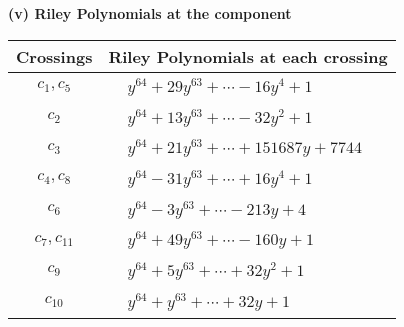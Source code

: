 \documentclass[1p]{elsarticle_modified}
\theoremstyle{definition}
\begin{document}
\newpage\renewcommand{\arraystretch}{1}
\flushleft \textbf{(v) Riley Polynomials at the component}\newline \\
\begin{tabular}{m{50pt}|m{274pt}}
Crossings & \hspace{64pt}Riley Polynomials at each crossing \\
\hline $$\begin{aligned}c_{1},c_{5}\end{aligned}$$&$\begin{aligned}
&y^{64}+29 y^{63}+\cdots-16 y^4+1
\end{aligned}$\\
\hline $$\begin{aligned}c_{2}\end{aligned}$$&$\begin{aligned}
&y^{64}+13 y^{63}+\cdots-32 y^2+1
\end{aligned}$\\
\hline $$\begin{aligned}c_{3}\end{aligned}$$&$\begin{aligned}
&y^{64}+21 y^{63}+\cdots+151687 y+7744
\end{aligned}$\\
\hline $$\begin{aligned}c_{4},c_{8}\end{aligned}$$&$\begin{aligned}
&y^{64}-31 y^{63}+\cdots+16 y^4+1
\end{aligned}$\\
\hline $$\begin{aligned}c_{6}\end{aligned}$$&$\begin{aligned}
&y^{64}-3 y^{63}+\cdots-213 y+4
\end{aligned}$\\
\hline $$\begin{aligned}c_{7},c_{11}\end{aligned}$$&$\begin{aligned}
&y^{64}+49 y^{63}+\cdots-160 y+1
\end{aligned}$\\
\hline $$\begin{aligned}c_{9}\end{aligned}$$&$\begin{aligned}
&y^{64}+5 y^{63}+\cdots+32 y^2+1
\end{aligned}$\\
\hline $$\begin{aligned}c_{10}\end{aligned}$$&$\begin{aligned}
&y^{64}+y^{63}+\cdots+32 y+1
\end{aligned}$\\
\hline
\end{tabular}\\~\\
\end{document}
